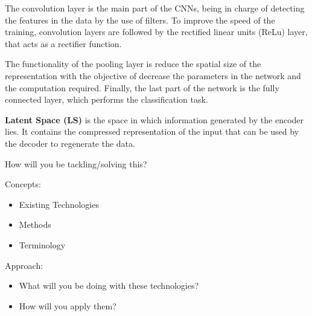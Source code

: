 The convolution layer is the main part of the CNNs, being in charge of detecting the features in the data by the use of filters. To improve the speed of the training, convolution layers are followed by the rectified linear units (ReLu) layer, that acts as a rectifier function.

The functionality of the pooling layer is reduce the spatial size of the representation with the objective of decrease the parameters in the network and the computation required. Finally, the last part of the network is the fully connected layer, which performs the classification task.



\textbf{Latent Space (LS)} is the space in which information generated by the encoder lies. It contains the compressed representation of the input that can be used by the decoder to regenerate the data. 

\hrulefill

How will you be tackling/solving this?



Concepts:
\begin{itemize}
\item Existing Technologies
\item Methods
\item Terminology
\end{itemize}

Approach:
\begin{itemize}
\item What will you be doing with these technologies?
\item How will you apply them?
\end{itemize}